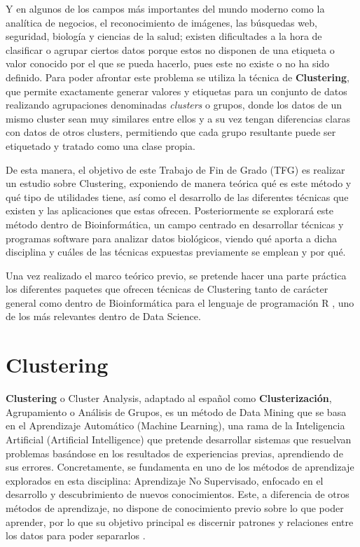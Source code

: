 \documentclass[3p,twocolumn]{elsarticle}
\begin{document}
Y en algunos de los campos más importantes del mundo moderno como la analítica de negocios, el reconocimiento de imágenes, las búsquedas web, seguridad, biología y ciencias de la salud; existen dificultades a la hora de clasificar o agrupar ciertos datos porque estos no disponen de una etiqueta o valor conocido por el que se pueda hacerlo, pues este no existe o no ha sido definido. Para poder afrontar este problema se utiliza la técnica de \textbf{Clustering}, que permite exactamente generar valores y etiquetas para un conjunto de datos realizando agrupaciones denominadas \textit{clusters} o grupos, donde los datos de un mismo cluster sean muy similares entre ellos y a su vez tengan diferencias claras con datos de otros clusters, permitiendo que cada grupo resultante puede ser etiquetado y tratado como una clase propia.

De esta manera, el objetivo de este Trabajo de Fin de Grado (TFG) es realizar un estudio sobre Clustering, exponiendo de manera teórica qué es este método y qué tipo de utilidades tiene, así como el desarrollo de las diferentes técnicas que existen y las aplicaciones que estas ofrecen. Posteriormente se explorará este método dentro de Bioinformática, un campo centrado en desarrollar técnicas y programas software para analizar datos biológicos, viendo qué aporta a dicha disciplina y cuáles de las técnicas expuestas previamente se emplean y por qué. 

Una vez realizado el marco teórico previo, se pretende hacer una parte práctica los diferentes paquetes que ofrecen técnicas de Clustering tanto de carácter general como dentro de Bioinformática para el lenguaje de programación R \cite{6}, uno de los más relevantes dentro de Data Science.




\section{Clustering} 

\textbf{Clustering} o Cluster Analysis, adaptado al español como \textbf{Clusterización}, Agrupamiento o Análisis de Grupos, es un método de Data Mining que se basa en el Aprendizaje Automático (Machine Learning), una rama de la Inteligencia Artificial (Artificial Intelligence) que pretende desarrollar sistemas que resuelvan problemas basándose en los resultados de experiencias previas, aprendiendo de sus errores. Concretamente, se fundamenta en uno de los métodos de aprendizaje explorados en esta disciplina: Aprendizaje No Supervisado, enfocado en el desarrollo y descubrimiento de nuevos conocimientos. Este, a diferencia de otros métodos de aprendizaje, no dispone de conocimiento previo sobre lo que poder aprender, por lo que su objetivo principal es discernir patrones y relaciones entre los datos para poder separarlos \cite{7}.
\end{document}
